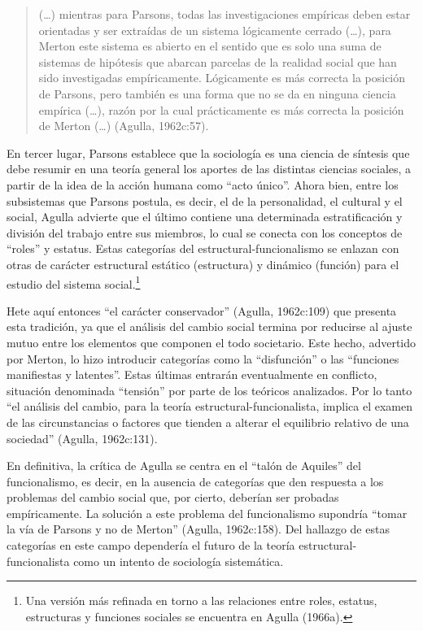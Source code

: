 \begin{quote}
(\dots) mientras para Parsons, todas las investigaciones empíricas deben estar orientadas y ser extraídas de un sistema lógicamente cerrado (\dots), para Merton este sistema es abierto en el sentido que es solo una suma de sistemas de hipótesis que abarcan parcelas de la realidad social que han sido investigadas empíricamente. Lógicamente es más correcta la posición de Parsons, pero también es una forma que no se da en ninguna ciencia empírica (\dots), razón por la cual prácticamente es más correcta la posición de Merton (\dots) (Agulla, 1962c:57).
\end{quote}

En tercer lugar, Parsons establece que la sociología es una ciencia de síntesis que debe resumir en una teoría general los aportes de las distintas ciencias sociales, a partir de la idea de la acción humana como \enquote{acto único}. Ahora bien, entre los subsistemas que Parsons postula, es decir, el de la personalidad, el cultural y el social, Agulla advierte que el último contiene una determinada estratificación y división del trabajo entre sus miembros, lo cual se conecta con los conceptos de \enquote{roles} y estatus. Estas categorías del estructural-funcionalismo se enlazan con otras de carácter estructural estático (estructura) y dinámico (función) para el estudio del sistema social.\footnote{Una versión más refinada en torno a las relaciones entre roles, estatus, estructuras y funciones sociales se encuentra en Agulla (1966a).}

Hete aquí entonces \enquote{el carácter conservador} (Agulla, 1962c:109) que presenta esta tradición, ya que el análisis del cambio social termina por reducirse al ajuste mutuo entre los elementos que componen el todo societario. Este hecho, advertido por Merton, lo hizo introducir categorías como la \enquote{disfunción} o las \enquote{funciones manifiestas y latentes}. Estas últimas entrarán eventualmente en conflicto, situación denominada \enquote{tensión} por parte de los teóricos analizados. Por lo tanto \enquote{el análisis del cambio, para la teoría estructural-funcionalista, implica el examen de las circunstancias o factores que tienden a alterar el equilibrio relativo de una sociedad} (Agulla, 1962c:131).

En definitiva, la crítica de Agulla se centra en el \enquote{talón de Aquiles} del funcionalismo, es decir, en la ausencia de categorías que den respuesta a los problemas del cambio social que, por cierto, deberían ser probadas empíricamente. La solución a este problema del funcionalismo supondría \enquote{tomar la vía de Parsons y no de Merton} (Agulla, 1962c:158). Del hallazgo de estas categorías en este campo dependería el futuro de la teoría estructural-funcionalista como un intento de sociología sistemática.

